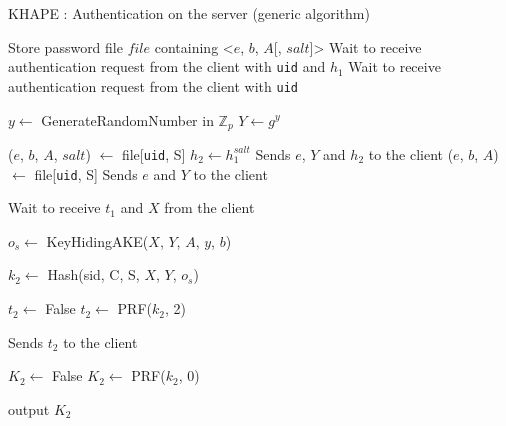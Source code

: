 \documentclass[../report.tex]{subfiles}
\begin{document}
\begin{algorithm}
\caption{KHAPE : Authentication on the server (generic algorithm)}
\label{login_server}
\begin{algorithmic}
\Require Store password file $file$ containing <$e$, $b$, $A$[, $salt$]>
    \State Wait to receive authentication request from the client with \verb|uid| and $h_1$
\Else
    \State Wait to receive authentication request from the client with \verb|uid|
\EndIf

\State $y \gets$ GenerateRandomNumber in $\mathbb{Z}_p$
\State $Y \gets g^y$

    \State ($e$, $b$, $A$, $salt$) $\gets$ file[\verb|uid|, S] %
    \State $h_2 \gets h_1^{salt}$
    \State Sends $e$, $Y$ and $h_2$ to the client
\Else
    \State ($e$, $b$, $A$) $\gets$ file[\verb|uid|, S] %
    \State Sends $e$ and $Y$ to the client
\EndIf


\State Wait to receive $t_1$ and $X$ from the client


\State $o_s \gets$ KeyHidingAKE($X$, $Y$, $A$, $y$, $b$)

\State $k_2 \gets$ Hash(sid, C, S, $X$, $Y$, $o_s$)


    \State $t_2 \gets$ False
\Else
    \State $t_2 \gets$ PRF($k_2$, 2)
\EndIf


\State Sends $t_2$ to the client


    \State $K_2 \gets$ False
\Else
    \State $K_2 \gets$ PRF($k_2$, 0)
\EndIf

\State output $K_2$
\end{algorithmic}
\end{algorithm}




\end{document}
